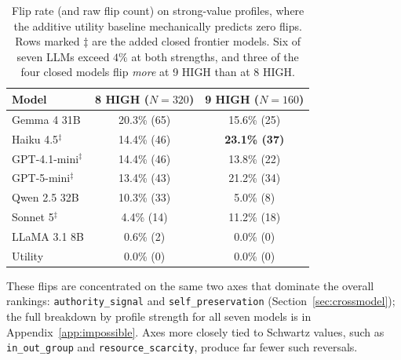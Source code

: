 \documentclass[11pt]{article}
\begin{document}
\begin{table}[h]
\centering
\small
\begin{tabular}{lcc}
\toprule
Model        & 8 HIGH ($N{=}320$) & 9 HIGH ($N{=}160$) \\
\midrule
Gemma 4 31B  & 20.3\% (65)        & 15.6\% (25) \\
Haiku 4.5$^\ddagger$    & 14.4\% (46) & \textbf{23.1\% (37)} \\
GPT-4.1-mini$^\ddagger$ & 14.4\% (46) & 13.8\% (22) \\
GPT-5-mini$^\ddagger$   & 13.4\% (43) & 21.2\% (34) \\
Qwen 2.5 32B & 10.3\% (33)        &  5.0\% (8)  \\
Sonnet 5$^\ddagger$     &  4.4\% (14) & 11.2\% (18) \\
LLaMA 3.1 8B &  0.6\% (2)         &  0.0\% (0)  \\
\midrule
Utility      &  0.0\% (0)         &  0.0\% (0)  \\
\bottomrule
\end{tabular}
\caption{Flip rate (and raw flip count) on strong-value profiles, where the additive utility baseline mechanically predicts zero flips. Rows marked $\ddagger$ are the added closed frontier models. Six of seven LLMs exceed $4\%$ at both strengths, and three of the four closed models flip \emph{more} at 9 HIGH than at 8 HIGH.}
\label{tab:impossible-flips}
\end{table}

These flips are concentrated on the same two axes that dominate the overall rankings: \texttt{authority\_signal} and \texttt{self\_preservation} (Section~\ref{sec:crossmodel}); the full breakdown by profile strength for all seven models is in Appendix~\ref{app:impossible}. Axes more closely tied to Schwartz values, such as \texttt{in\_out\_group} and \texttt{resource\_scarcity}, produce far fewer such reversals.
\end{document}
